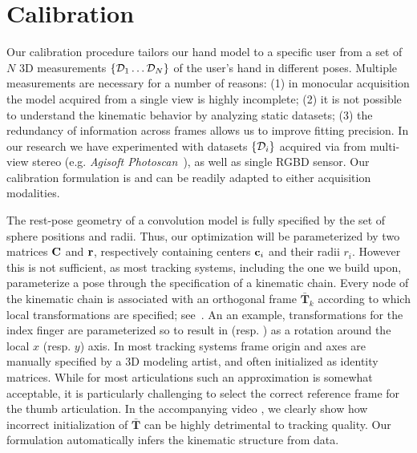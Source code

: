 \section{Calibration}
Our calibration procedure tailors our hand model to a specific user from a set of $N$ 3D measurements $\{ \mathcal{D}_1 \dots \mathcal{D}_N \}$ of the user's hand in different poses. Multiple measurements are necessary for a number of reasons: (1) in monocular acquisition the model acquired from a single view is highly incomplete; (2) it is not possible to understand the kinematic behavior by analyzing static datasets; (3) the redundancy of information across frames allows us to improve fitting precision. In our research we have experimented with datasets $\{\mathcal{D}_i\}$ acquired via from multi-view stereo (e.g. \emph{Agisoft Photoscan~\textcopyright}), as well as single RGBD sensor. Our calibration formulation is  and can be readily adapted to either acquisition modalities.

The rest-pose geometry of a convolution model is fully specified by the set of sphere positions and radii. Thus, our optimization will be parameterized by two matrices $\mathbf{C}$ and $\mathbf{r}$, respectively containing centers $\mathbf{c}_i$ and their radii $r_i$. However this is not sufficient, as most tracking systems, including the one we build upon, parameterize a pose through the specification of a kinematic chain. 
Every node of the kinematic chain is associated with an orthogonal frame $\mathbf{\bar{T}}_k$ according to which local transformations are specified; see~. An an example, transformations for the index finger are parameterized so to result in  (resp. ) as a rotation around the local $x$ (resp. $y$) axis. In most tracking systems frame origin and axes are manually specified by a 3D modeling artist, and often initialized as identity matrices. While for most articulations such an approximation is somewhat acceptable, it is particularly challenging to select the correct reference frame for the thumb articulation. In the accompanying video \todo{[00:00]}, we clearly show how incorrect initialization of $\mathbf{\bar{T}}$ can be highly detrimental to tracking quality. Our formulation automatically infers the kinematic structure from data.

